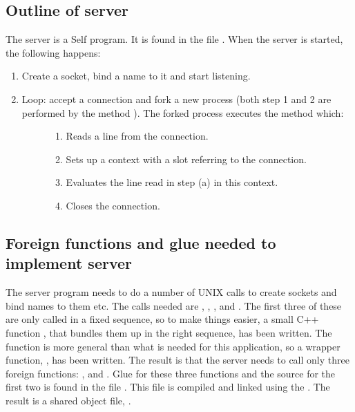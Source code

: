 \documentclass[letterpaper,10pt,english]{sphinxmanual}
\begin{document}
\subsection{Outline of server}
\label{\detokenize{vmref:outline-of-server}}
The server is a Self program. It is found in the file . When the server is started, the
following happens:
\begin{enumerate}
\item {} 
Create a socket, bind a name to it and start listening.

\item {} \begin{description}
\item[{Loop: accept a connection and fork a new process (both step 1 and 2 are performed by the method ). The forked process executes the method  which:}] \leavevmode\begin{enumerate}
\item {} 
Reads a line from the connection.

\item {} 
Sets up a context with a slot  referring to the connection.

\item {} 
Evaluates the line read in step (a) in this context.

\item {} 
Closes the connection.

\end{enumerate}

\end{description}

\end{enumerate}


\subsection{Foreign functions and glue needed to implement server}
\label{\detokenize{vmref:foreign-functions-and-glue-needed-to-implement-server}}
The server program needs to do a number of UNIX calls to create sockets and bind names to them
etc. The calls needed are , , ,  and . The first three of these
are only called in a fixed sequence, so to make things easier, a small C++ function
, that bundles them up in the right sequence, has been written. The 
function is more general than what is needed for this application, so a wrapper function,
, has been written. The result is that the server needs to call only three foreign
functions: ,  and . Glue for these three functions
and the source for the first two is found in the file . This file is compiled and linked
using the . The result is a shared object file, .
\end{document}
